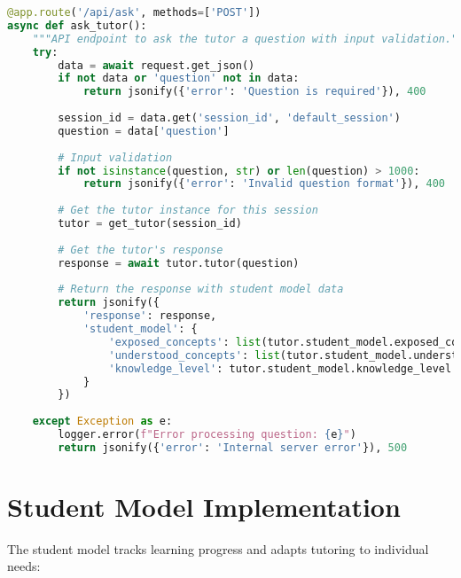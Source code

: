 \begin{lstlisting}[language=Python, caption=API Implementation, label=lst:api-implementation]
@app.route('/api/ask', methods=['POST'])
async def ask_tutor():
    """API endpoint to ask the tutor a question with input validation."""
    try:
        data = await request.get_json()
        if not data or 'question' not in data:
            return jsonify({'error': 'Question is required'}), 400
        
        session_id = data.get('session_id', 'default_session')
        question = data['question']
        
        # Input validation
        if not isinstance(question, str) or len(question) > 1000:
            return jsonify({'error': 'Invalid question format'}), 400
        
        # Get the tutor instance for this session
        tutor = get_tutor(session_id)
        
        # Get the tutor's response
        response = await tutor.tutor(question)
        
        # Return the response with student model data
        return jsonify({
            'response': response,
            'student_model': {
                'exposed_concepts': list(tutor.student_model.exposed_concepts),
                'understood_concepts': list(tutor.student_model.understood_concepts),
                'knowledge_level': tutor.student_model.knowledge_level
            }
        })
    
    except Exception as e:
        logger.error(f"Error processing question: {e}")
        return jsonify({'error': 'Internal server error'}), 500
\end{lstlisting}

\section{Student Model Implementation}
\label{sec:student-model}

The student model tracks learning progress and adapts tutoring to individual needs:

